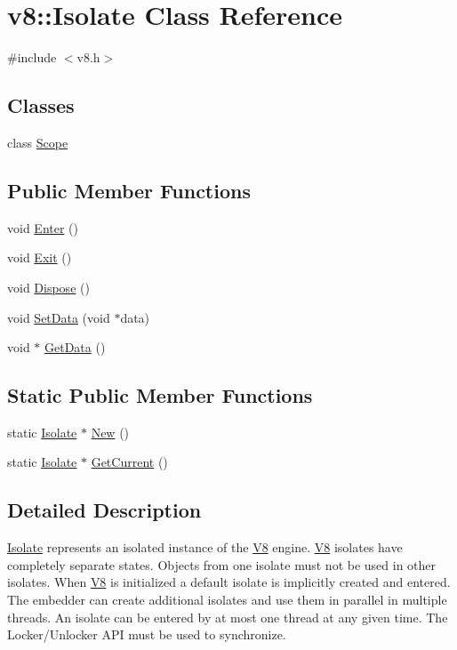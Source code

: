\hypertarget{classv8_1_1_isolate}{}\section{v8\+:\+:Isolate Class Reference}
\label{classv8_1_1_isolate}


{\ttfamily \#include $<$v8.\+h$>$}

\subsection*{Classes}
\begin{DoxyCompactItemize}
\item 
class \hyperlink{classv8_1_1_isolate_1_1_scope}{Scope}
\end{DoxyCompactItemize}
\subsection*{Public Member Functions}
\begin{DoxyCompactItemize}
\item 
void \hyperlink{classv8_1_1_isolate_aec80bb49b6b7647ff75e8f2cc9484ea3}{Enter} ()
\item 
void \hyperlink{classv8_1_1_isolate_a64a8503cafd00d1d2cadfbb0c2345054}{Exit} ()
\item 
void \hyperlink{classv8_1_1_isolate_a1a5a5762e4221aff8c6b10f9e3cec0af}{Dispose} ()
\item 
void \hyperlink{classv8_1_1_isolate_a57e22868fac4e090f05d23e432e2c771}{Set\+Data} (void $\ast$data)
\item 
void $\ast$ \hyperlink{classv8_1_1_isolate_a83c4ff274f359aa9582b15f300269b58}{Get\+Data} ()
\end{DoxyCompactItemize}
\subsection*{Static Public Member Functions}
\begin{DoxyCompactItemize}
\item 
static \hyperlink{classv8_1_1_isolate}{Isolate} $\ast$ \hyperlink{classv8_1_1_isolate_a36f397e1d09e0122e89641288f348d2d}{New} ()
\item 
static \hyperlink{classv8_1_1_isolate}{Isolate} $\ast$ \hyperlink{classv8_1_1_isolate_aa79441b5da4438221d0f38790c4de2ed}{Get\+Current} ()
\end{DoxyCompactItemize}


\subsection{Detailed Description}
\hyperlink{classv8_1_1_isolate}{Isolate} represents an isolated instance of the \hyperlink{classv8_1_1_v8}{V8} engine. \hyperlink{classv8_1_1_v8}{V8} isolates have completely separate states. Objects from one isolate must not be used in other isolates. When \hyperlink{classv8_1_1_v8}{V8} is initialized a default isolate is implicitly created and entered. The embedder can create additional isolates and use them in parallel in multiple threads. An isolate can be entered by at most one thread at any given time. The Locker/\+Unlocker A\+P\+I must be used to synchronize. 


